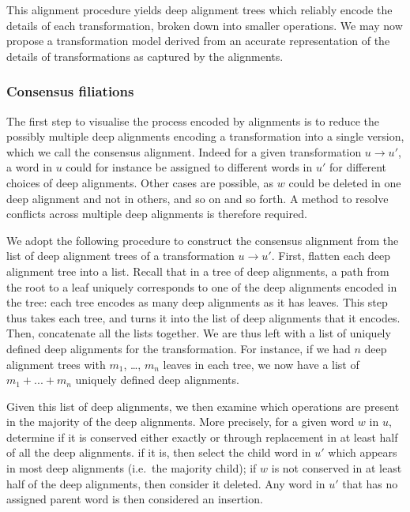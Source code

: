 This alignment procedure yields deep alignment trees which reliably encode the details of
each transformation, broken down into smaller operations. We may now propose a transformation model derived from an accurate representation of the details of transformations as captured by the alignments.

\subsubsection{Consensus filiations}\label{consensus-filiations}

The first step to visualise the process encoded by alignments is to
reduce the possibly multiple deep alignments encoding a transformation
into a single version, which we call the consensus alignment. Indeed for
a given transformation \(u \rightarrow u'\), a word in \(u\) could for
instance be assigned to different words in \(u'\) for different choices
of deep alignments. Other cases are possible, as \(w\) could be deleted
in one deep alignment and not in others, and so on and so forth. A
method to resolve conflicts across multiple deep alignments is therefore
required.

We adopt the following procedure to construct the consensus alignment
from the list of deep alignment trees of a transformation
\(u \rightarrow u'\). First, flatten each deep alignment tree into a
list. Recall that in a tree of deep alignments, a path from the root to
a leaf uniquely corresponds to one of the deep alignments encoded in the
tree: each tree encodes as many deep alignments as it has leaves. This
step thus takes each tree, and turns it into the list of deep alignments
that it encodes. Then, concatenate all the lists together. We are thus
left with a list of uniquely defined deep alignments for the
transformation. For instance, if we had \(n\) deep alignment trees with
\(m_1\), \ldots{}, \(m_n\) leaves in each tree, we now have a list of
\(m_1 + ... + m_n\) uniquely defined deep alignments.

Given this list of deep alignments, we then examine which operations are
present in the majority of the deep alignments. More precisely, for a
given word \(w\) in \(u\), determine if it is conserved either exactly
or through replacement in at least half of all the deep alignments. if
it is, then select the child word in \(u'\) which appears in most deep
alignments (i.e.~the majority child); if \(w\) is not conserved in at
least half of the deep alignments, then consider it deleted. Any word in
\(u'\) that has no assigned parent word is then considered an insertion.

